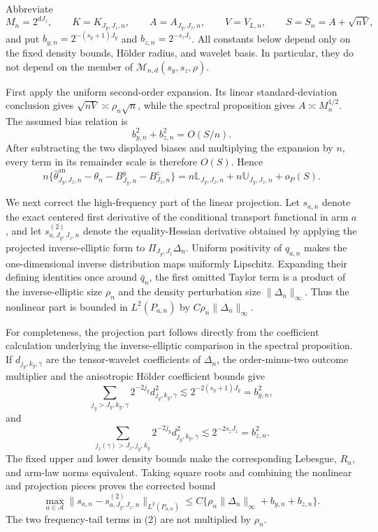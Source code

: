 Abbreviate
\[
M_n=2^{dJ_z},\qquad K=K_{J_y,J_z,n},\qquad
A=A_{J_y,J_z,n},\qquad V=V_{L,n},\qquad S=S_n=A+\sqrt{nV},
\]
and put \(b_{y,n}=2^{-(s_y+1)J_y}\) and \(b_{z,n}=2^{-s_zJ_z}\).  All constants below depend only on the fixed density bounds, H\"older radius, and wavelet basis.  In particular, they do not depend on the member of \(\mathcal M_{n,d}(s_y,s_z,\rho)\).

First apply the uniform second-order expansion.  Its linear standard-deviation conclusion gives \(\sqrt{nV}\asymp\rho_n\sqrt n\), while the spectral proposition gives \(A\asymp M_n^{1/2}\).  The assumed bias relation is
\[
b_{y,n}^2+b_{z,n}^2=O(S/n).
\]
After subtracting the two displayed biases and multiplying the expansion by \(n\), every term in its remainder scale is therefore \(O(S)\).  Hence
\[
n\{\widehat\theta^{\mathrm{an}}_{J_y,J_z,n}-\theta_n-B^y_{J_y,n}-B^z_{J_z,n}\}
=n\mathbb L_{J_y,J_z,n}+n\mathbb U_{J_y,J_z,n}+o_P(S). \tag{1}
\]

We next correct the high-frequency part of the linear projection.  Let \(s_{a,n}\) denote the exact centered first derivative of the conditional transport functional in arm \(a\), and let \(s^{(2)}_{a,J_y,J_z,n}\) denote the equality-Hessian derivative obtained by applying the projected inverse-elliptic form to \(\Pi_{J_y,J_z}\Delta_n\).  Uniform positivity of \(q_{a,n}\) makes the one-dimensional inverse distribution maps uniformly Lipschitz.  Expanding their defining identities once around \(\bar q_n\), the first omitted Taylor term is a product of the inverse-elliptic size \(\rho_n\) and the density perturbation size \(\|\Delta_n\|_\infty\).  Thus the nonlinear part is bounded in \(L^2(P_{a,n})\) by \(C\rho_n\|\Delta_n\|_\infty\).

For completeness, the projection part follows directly from the coefficient calculation underlying the inverse-elliptic comparison in the spectral proposition.  If \(d_{j_y,k_y,\gamma}\) are the tensor-wavelet coefficients of \(\Delta_n\), the order-minus-two outcome multiplier and the anisotropic H\"older coefficient bounds give
\[
\sum_{j_y>J_y,k_y,\gamma}2^{-2j_y}d_{j_y,k_y,\gamma}^2
\lesssim 2^{-2(s_y+1)J_y}=b_{y,n}^2,
\]
and
\[
\sum_{j_z(\gamma)>J_z,j_y,k_y}2^{-2j_y}d_{j_y,k_y,\gamma}^2
\lesssim 2^{-2s_zJ_z}=b_{z,n}^2.
\]
The fixed upper and lower density bounds make the corresponding Lebesgue, \(R_n\), and arm-law norms equivalent.  Taking square roots and combining the nonlinear and projection pieces proves the corrected bound
\[
\max_{a\in\mathcal A}
\|s_{a,n}-s^{(2)}_{a,J_y,J_z,n}\|_{L^2(P_{a,n})}
\le C\{\rho_n\|\Delta_n\|_\infty+b_{y,n}+b_{z,n}\}. \tag{2}
\]
The two frequency-tail terms in (2) are not multiplied by \(\rho_n\).

